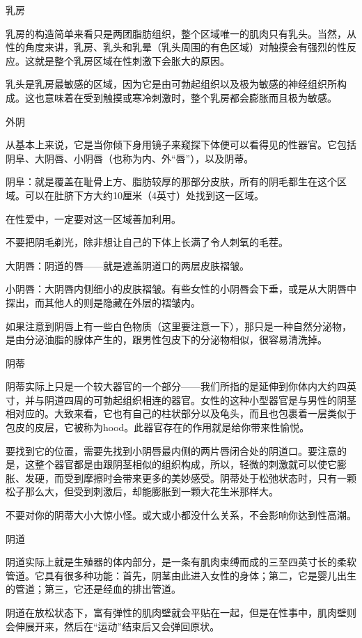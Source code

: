 \documentclass[12pt,UTF8]{ctexbook}
\begin{document}
乳房

乳房的构造简单来看只是两团脂肪组织，整个区域唯一的肌肉只有乳头。当然，从性的角度来讲，乳房、乳头和乳晕（乳头周围的有色区域）对触摸会有强烈的性反应。这就是整个乳房区域在性刺激下会胀大的原因。

乳头是乳房最敏感的区域，因为它是由可勃起组织以及极为敏感的神经组织所构成。这也意味着在受到触摸或寒冷刺激时，整个乳房都会膨胀而且极为敏感。

外阴

从基本上来说，它是当你倾下身用镜子来窥探下体便可以看得见的性器官。它包括阴阜、大阴唇、小阴唇（也称为内、外“唇”），以及阴蒂。

阴阜：就是覆盖在耻骨上方、脂肪较厚的那部分皮肤，所有的阴毛都生在这个区域。可以在肚脐下方大约10厘米（4英寸）处找到这一区域。

在性爱中，一定要对这一区域善加利用。

不要把阴毛剃光，除非想让自己的下体上长满了令人刺氧的毛茬。

大阴唇：阴道的唇——就是遮盖阴道口的两层皮肤褶皱。

小阴唇：大阴唇内侧细小的皮肤褶皱。有些女性的小阴唇会下垂，或是从大阴唇中探出，而其他人的则是隐藏在外层的褶皱内。

如果注意到阴唇上有一些白色物质（这里要注意一下），那只是一种自然分泌物，是由分泌油脂的腺体产生的，跟男性包皮下的分泌物相似，很容易清洗掉。

阴蒂

阴蒂实际上只是一个较大器官的一个部分——我们所指的是延伸到你体内大约四英寸，并与阴道四周的可勃起组织相连的器官。女性的这种小型器官是与男性的阴茎相对应的。大致来看，它也有自己的柱状部分以及龟头，而且也包裹着一层类似于包皮的皮层，它被称为hood。此器官存在的作用就是给你带来性愉悦。

要找到它的位置，需要先找到小阴唇最内侧的两片唇闭合处的阴道口。要注意的是，这整个器官都是由跟阴茎相似的组织构成，所以，轻微的刺激就可以使它膨胀、发硬，而受到摩擦时会带来更多的美妙感受。阴蒂处于松弛状态时，只有一颗松子那么大，但受到刺激后，却能膨胀到一颗大花生米那样大。

不要对你的阴蒂大小大惊小怪。或大或小都没什么关系，不会影响你达到性高潮。

阴道

阴道实际上就是生殖器的体内部分，是一条有肌肉束缚而成的三至四英寸长的柔软管道。它具有很多种功能：首先，阴茎由此进入女性的身体；第二，它是婴儿出生的管道；第三，它还是经血的排出管道。

阴道在放松状态下，富有弹性的肌肉壁就会平贴在一起，但是在性事中，肌肉壁则会伸展开来，然后在“运动”结束后又会弹回原状。
\end{document}

